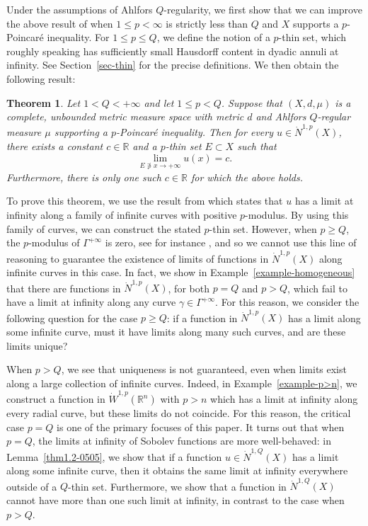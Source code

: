 \documentclass[10pt]{amsart}
\newtheorem{theorem}{Theorem}[section]
\numberwithin{equation}{section}
\newcommand{\R}{\mathbb{R}}
\begin{document}
Under the assumptions of Ahlfors $Q$-regularity, we first show that we can improve{
the above result of \cite{KN22}} when $1\le p<\infty$ is strictly less than $Q$ and $X$ supports a $p$-Poincar\'e inequality.  For $1\le p\le Q$, we define the notion of a $p$-thin set, which roughly speaking has sufficiently small Hausdorff content in dyadic annuli at infinity. See Section~\ref{sec-thin} for the precise definitions.  We then obtain the following result:  
\begin{theorem}\label{thm:p<Q Thin}
    Let $1< Q<+\infty$ and let $1\le p<Q$.  Suppose that $(X,d,\mu)$ is a complete, unbounded metric measure space with metric $d$ and Ahlfors $Q$-regular measure $\mu$ supporting a $p$-Poincar\'e inequality. Then for every $u\in\dot N^{1,p}(X)$, there exists a constant $c\in\R$ and a $p$-thin set $E\subset X$ such that 
    \[
    \lim_{E\not\ni x\to+\infty}u(x)=c.
    \]
    Furthermore, there is only one such $c\in\R$ for which the above holds.
\end{theorem}

To prove this theorem, we use the result from \cite{KN22} which states that $u$ has a limit at infinity along a family of infinite curves with positive $p$-modulus.  By using this family of curves, we can construct the stated $p$-thin set.  However, when $p\ge Q$, the $p$-modulus of $\Gamma^{+\infty}$ is zero, see for instance \cite[Chapter 5]{pekka}, and so we cannot use this line of reasoning to guarantee the existence of limits of functions in $\dot N^{1,p}(X)$ along infinite curves in this case.  In fact, we show in Example~\ref{example-homogeneous} that there are functions in $\dot N^{1,p}(X)$, for both $p=Q$ and $p>Q$, which fail to have a limit at infinity along any curve $\gamma\in\Gamma^{+\infty}$.
For this reason, we consider the following question for the case $p\ge Q$: if a function in $\dot N^{1,p}(X)$ has a limit along some infinite curve, must it have limits along many such curves, and are these limits unique?

When $p>Q$, we see that uniqueness is not guaranteed, even when limits exist along a large collection of infinite curves.  Indeed, in Example~\ref{example-p>n}, we construct a function in $\dot W^{1,p}(\R^n)$ with $p>n$ which has a limit at infinity along every radial curve, but these limits do not coincide.  For this reason, the critical case $p=Q$ is one of the primary focuses of this paper.  It turns out that when $p=Q$, the limits at infinity of Sobolev functions are more well-behaved: in Lemma~\ref{thm1.2-0505}, we show that if a function $u\in\dot N^{1,Q}(X)$ has a limit along some infinite curve, then it obtains the same limit at infinity everywhere outside of a $Q$-thin set. 
Furthermore, we show that a function in $\dot N^{1,Q}(X)$ cannot have more than one such limit at infinity, in contrast to the case when $p>Q$.
\end{document}
